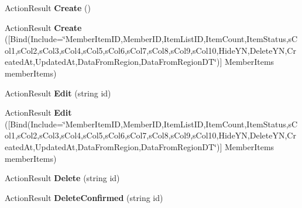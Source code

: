\begin{DoxyCompactItemize}
\item 
Action\+Result {\bfseries Create} ()\hypertarget{class_cloud_bread_admin_web_1_1_controllers_1_1_x___x_member_items_controller_a5a81f0e7f646fc730103206f03514f20}{}\label{class_cloud_bread_admin_web_1_1_controllers_1_1_x___x_member_items_controller_a5a81f0e7f646fc730103206f03514f20}

\item 
Action\+Result {\bfseries Create} (\mbox{[}Bind(Include=\char`\"{}Member\+Item\+ID,Member\+ID,Item\+List\+ID,Item\+Count,Item\+Status,s\+Col1,s\+Col2,s\+Col3,s\+Col4,s\+Col5,s\+Col6,s\+Col7,s\+Col8,s\+Col9,s\+Col10,Hide\+YN,Delete\+YN,Created\+At,Updated\+At,Data\+From\+Region,Data\+From\+Region\+DT\char`\"{})\mbox{]} Member\+Items member\+Items)\hypertarget{class_cloud_bread_admin_web_1_1_controllers_1_1_x___x_member_items_controller_ad37e8a5086944acb6e6060daf77aaad0}{}\label{class_cloud_bread_admin_web_1_1_controllers_1_1_x___x_member_items_controller_ad37e8a5086944acb6e6060daf77aaad0}

\item 
Action\+Result {\bfseries Edit} (string id)\hypertarget{class_cloud_bread_admin_web_1_1_controllers_1_1_x___x_member_items_controller_a262b75b71297635b4edbb0e2cfd355cb}{}\label{class_cloud_bread_admin_web_1_1_controllers_1_1_x___x_member_items_controller_a262b75b71297635b4edbb0e2cfd355cb}

\item 
Action\+Result {\bfseries Edit} (\mbox{[}Bind(Include=\char`\"{}Member\+Item\+ID,Member\+ID,Item\+List\+ID,Item\+Count,Item\+Status,s\+Col1,s\+Col2,s\+Col3,s\+Col4,s\+Col5,s\+Col6,s\+Col7,s\+Col8,s\+Col9,s\+Col10,Hide\+YN,Delete\+YN,Created\+At,Updated\+At,Data\+From\+Region,Data\+From\+Region\+DT\char`\"{})\mbox{]} Member\+Items member\+Items)\hypertarget{class_cloud_bread_admin_web_1_1_controllers_1_1_x___x_member_items_controller_a8a4cc2e0c66aab962df56bc94bd6fd42}{}\label{class_cloud_bread_admin_web_1_1_controllers_1_1_x___x_member_items_controller_a8a4cc2e0c66aab962df56bc94bd6fd42}

\item 
Action\+Result {\bfseries Delete} (string id)\hypertarget{class_cloud_bread_admin_web_1_1_controllers_1_1_x___x_member_items_controller_a19374341124efc33cd01403e4c111e1c}{}\label{class_cloud_bread_admin_web_1_1_controllers_1_1_x___x_member_items_controller_a19374341124efc33cd01403e4c111e1c}

\item 
Action\+Result {\bfseries Delete\+Confirmed} (string id)\hypertarget{class_cloud_bread_admin_web_1_1_controllers_1_1_x___x_member_items_controller_af4a7288b7d8e78923ef7ac1a7f5ef0a8}{}\label{class_cloud_bread_admin_web_1_1_controllers_1_1_x___x_member_items_controller_af4a7288b7d8e78923ef7ac1a7f5ef0a8}

\end{DoxyCompactItemize}

